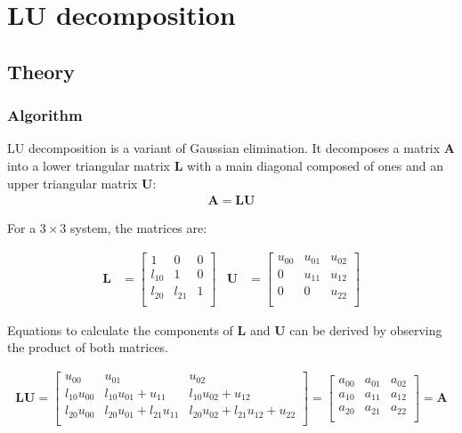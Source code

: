 \section{LU decomposition}
\label{sec:LU}
\subsection{Theory}
\subsubsection{Algorithm}

LU decomposition is a variant of Gaussian elimination. It decomposes a matrix $\mathbf{A}$ into a lower triangular matrix $\mathbf{L}$ with a main diagonal composed of ones and an upper triangular matrix $\mathbf{U}$:
\begin{align}
\mathbf{A} = \mathbf{L}\mathbf{U}
\end{align}

For a $3\times3$ system, the matrices are:

\begin{align}
\mathbf{L} 
& =
\begin{bmatrix}
1     &0     &0\\
l_{10}&1     &0\\
l_{20}&l_{21}&1\\
\end{bmatrix}
&
\mathbf{U} 
& =
\begin{bmatrix}
u_{00}&u_{01}&u_{02}\\
0     &u_{11}&u_{12}\\
0     &0     &u_{22}\\
\end{bmatrix}
\end{align}

Equations to calculate the components of $\mathbf{L}$ and $\mathbf{U}$ can be derived by observing the product of both matrices.

\begin{align}
\mathbf{L} \mathbf{U}
=
\begin{bmatrix}
u_{00}      &u_{01}                   &u_{02}\\
l_{10}u_{00}&l_{10}u_{01}+u_{11}      &l_{10}u_{02}+u_{12}\\
l_{20}u_{00}&l_{20}u_{01}+l_{21}u_{11}&l_{20}u_{02}+l_{21}u_{12}+u_{22}\\
\end{bmatrix}
=
\begin{bmatrix}
a_{00}&a_{01}&a_{02}\\
a_{10}&a_{11}&a_{12}\\
a_{20}&a_{21}&a_{22}\\
\end{bmatrix}
= 
\mathbf{A} 
\end{align}

